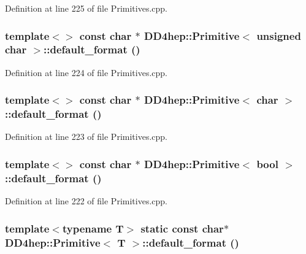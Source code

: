 Definition at line 225 of file Primitives.cpp.\hypertarget{struct_d_d4hep_1_1_primitive_a67ee0ebbf2f9e48bf65beb1e59959cbf}{
\subsubsection[{default\_\-format}]{\setlength{\rightskip}{0pt plus 5cm}template$<$$>$ const char $\ast$ {\bf DD4hep::Primitive}$<$ unsigned char $>$::default\_\-format ()}}
\label{struct_d_d4hep_1_1_primitive_a67ee0ebbf2f9e48bf65beb1e59959cbf}


Definition at line 224 of file Primitives.cpp.\hypertarget{struct_d_d4hep_1_1_primitive_a34149cd93b872c60022fa76228c455ee}{
\subsubsection[{default\_\-format}]{\setlength{\rightskip}{0pt plus 5cm}template$<$$>$ const char $\ast$ {\bf DD4hep::Primitive}$<$ char $>$::default\_\-format ()}}
\label{struct_d_d4hep_1_1_primitive_a34149cd93b872c60022fa76228c455ee}


Definition at line 223 of file Primitives.cpp.\hypertarget{struct_d_d4hep_1_1_primitive_a6089a5537a1e451b9e9dab455068d31c}{
\subsubsection[{default\_\-format}]{\setlength{\rightskip}{0pt plus 5cm}template$<$$>$ const char $\ast$ {\bf DD4hep::Primitive}$<$ bool $>$::default\_\-format ()}}
\label{struct_d_d4hep_1_1_primitive_a6089a5537a1e451b9e9dab455068d31c}


Definition at line 222 of file Primitives.cpp.\hypertarget{struct_d_d4hep_1_1_primitive_a27dce7707319f621a39cc7d90d55bfb0}{
\subsubsection[{default\_\-format}]{\setlength{\rightskip}{0pt plus 5cm}template$<$typename T$>$ static const char$\ast$ {\bf DD4hep::Primitive}$<$ {\bf T} $>$::default\_\-format ()}}
\label{struct_d_d4hep_1_1_primitive_a27dce7707319f621a39cc7d90d55bfb0}


